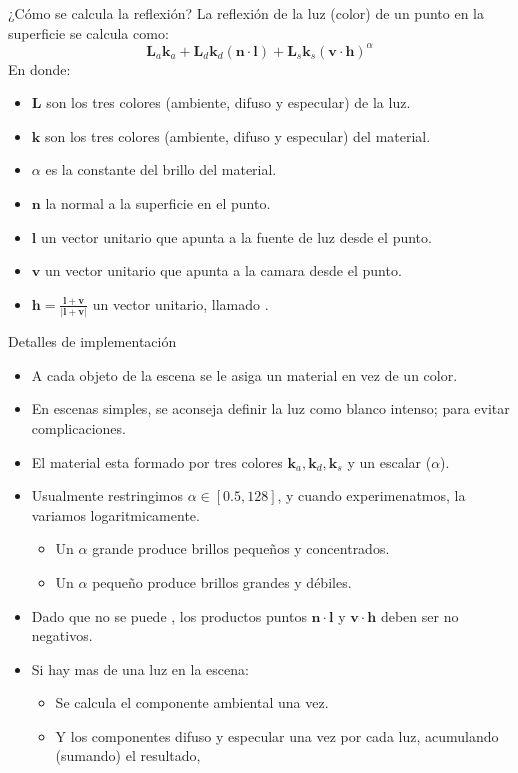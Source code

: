 \begin{frame}{¿Cómo se calcula la reflexión?}
La reflexión de la luz (color) de un punto en la superficie se calcula como:
 $$\mathbf{L}_a \mathbf{k}_a + \mathbf{L}_d \mathbf{k}_d (\mathbf{n} \cdot \mathbf{l}) + \mathbf{L}_s \mathbf{k}_s (\mathbf{v} \cdot \mathbf{h})^{\alpha}$$
 En donde:
 \begin{itemize}
  \item $\mathbf{L}$ son los tres colores (ambiente, difuso y especular) de la luz.
  \item $\mathbf{k}$ son los tres colores (ambiente, difuso y especular) del material.
  \item $\alpha$ es la constante del brillo del material.
  \item $\mathbf{n}$ la normal a la superficie en el punto.
  \item $\mathbf{l}$ un vector unitario que apunta a la fuente de luz desde el punto.
  \item $\mathbf{v}$ un vector unitario que apunta a la camara desde el punto.
  \item $\mathbf{h} = \frac{\mathbf{l} + \mathbf{v}}{|\mathbf{l} + \mathbf{v}|}$ un vector unitario, llamado .
 \end{itemize}
\end{frame}


\begin{frame}{Detalles de implementación}
\begin{itemize}
  \item A cada objeto de la escena se le asiga un material en vez de un color.
  \item En escenas simples, se aconseja definir la luz como blanco intenso; para evitar complicaciones.
   \item El material esta formado por tres colores $\mathbf{k}_a, \mathbf{k}_d, \mathbf{k}_s$ y un escalar ($\alpha$).
   \item Usualmente restringimos $\alpha \in [ 0.5, 128 ]$, y cuando experimenatmos, la variamos logaritmicamente.
  \begin{itemize}
   \item Un $\alpha$ grande produce brillos pequeños y concentrados.
   \item Un $\alpha$ pequeño produce brillos grandes y débiles.
  \end{itemize}
  \item Dado que no se puede , los productos puntos $\mathbf{n} \cdot \mathbf{l}$ y $\mathbf{v} \cdot \mathbf{h}$ deben ser no negativos.
  \item Si hay mas de una luz en la escena:
  \begin{itemize}
   \item Se calcula el componente ambiental una vez.
   \item Y los componentes difuso y especular una vez por cada luz, acumulando (sumando) el resultado,
  \end{itemize}
\end{itemize}
\end{frame}

